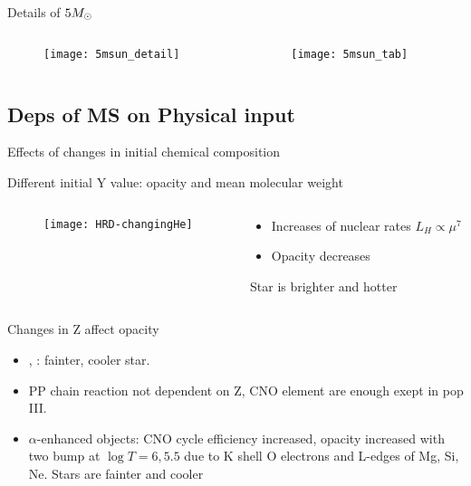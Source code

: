 \begin{frame}{Details of $5M_{\odot}{}$}
    \begin{columns}[T]
        \begin{column}{0.6\textwidth}
\begin{figure}[!ht]
    \texttt{[image: 5msun\_detail]}\label{fig:5msun_detail}
\end{figure}
        \end{column}
        \begin{column}{0.4\textwidth}
\begin{figure}[!ht]
    \texttt{[image: 5msun\_tab]}\label{fig:5msun_tab}
\end{figure}
        \end{column}
    \end{columns}
    
\end{frame}

\subsection{Deps of MS on Physical input}

\begin{frame}{Effects of changes in initial chemical composition}
\begin{block}{Different initial Y value: opacity and mean molecular weight}
\begin{columns}[T]
\begin{column}{0.5\textwidth}
\begin{figure}[!ht]\texttt{[image: HRD-changingHe]}\label{fig:HRD-changingHe}
\end{figure}
\end{column}
\begin{column}{0.5\textwidth}
\begin{itemize}
    \item Increases of nuclear rates $L_H\propto\mu^7$
    \item Opacity decreases
\end{itemize}
Star is brighter and hotter
\end{column}
\end{columns}
\end{block}
\begin{block}{Changes in Z affect opacity}
\begin{itemize}
    \item {}, \xaumenta{\kappa}: fainter, cooler star.
    \item PP chain reaction not dependent on Z, CNO element are enough exept in pop III.
    \item $\alpha$-enhanced objects: CNO cycle efficiency increased, opacity increased with two bump at $\log{T}=6,5.5$ due to K shell O electrons and L-edges of Mg, Si, Ne. Stars are fainter and cooler
\end{itemize}
\end{block}
\end{frame}

